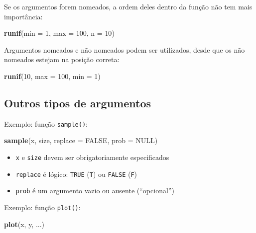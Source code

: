 \documentclass[10pt,a4paper]{book}
\newenvironment{Shaded}{\begin{snugshade}}{\end{snugshade}}
\newcommand{\KeywordTok}[1]{\textcolor[rgb]{0.13,0.29,0.53}{\textbf{#1}}}
\newcommand{\DataTypeTok}[1]{\textcolor[rgb]{0.13,0.29,0.53}{#1}}
\newcommand{\DecValTok}[1]{\textcolor[rgb]{0.00,0.00,0.81}{#1}}
\newcommand{\OtherTok}[1]{\textcolor[rgb]{0.56,0.35,0.01}{#1}}
\newcommand{\NormalTok}[1]{#1}
\providecommand{\tightlist}{%
  \setlength{\itemsep}{0pt}\setlength{\parskip}{0pt}}
\begin{document}
Se os argumentos forem nomeados, a ordem deles dentro da função não tem
mais importância:

\begin{Shaded}
\begin{Highlighting}[]
\KeywordTok{runif}\NormalTok{(}\DataTypeTok{min =} \DecValTok{1}\NormalTok{, }\DataTypeTok{max =} \DecValTok{100}\NormalTok{, }\DataTypeTok{n =} \DecValTok{10}\NormalTok{)}
\end{Highlighting}
\end{Shaded}

Argumentos nomeados e não nomeados podem ser utilizados, desde que os
não nomeados estejam na posição correta:

\begin{Shaded}
\begin{Highlighting}[]
\KeywordTok{runif}\NormalTok{(}\DecValTok{10}\NormalTok{, }\DataTypeTok{max =} \DecValTok{100}\NormalTok{, }\DataTypeTok{min =} \DecValTok{1}\NormalTok{)}
\end{Highlighting}
\end{Shaded}

\subsection{Outros tipos de
argumentos}\label{outros-tipos-de-argumentos}

Exemplo: função \texttt{sample()}:

\begin{Shaded}
\begin{Highlighting}[]
\KeywordTok{sample}\NormalTok{(x, size, }\DataTypeTok{replace =} \OtherTok{FALSE}\NormalTok{, }\DataTypeTok{prob =} \OtherTok{NULL}\NormalTok{)}
\end{Highlighting}
\end{Shaded}

\begin{itemize}
\tightlist
\item
  \texttt{x} e \texttt{size} devem ser obrigatoriamente especificados
\item
  \texttt{replace} é lógico: \texttt{TRUE} (\texttt{T}) ou
  \texttt{FALSE} (\texttt{F})
\item
  \texttt{prob} é um argumento vazio ou ausente (``opcional'')
\end{itemize}

Exemplo: função \texttt{plot()}:

\begin{Shaded}
\begin{Highlighting}[]
\KeywordTok{plot}\NormalTok{(x, y, ...)}
\end{Highlighting}
\end{Shaded}
\end{document}
